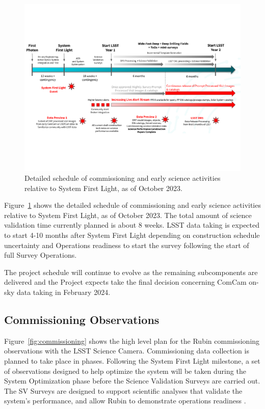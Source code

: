 \begin{figure}[htb]
\centering
\includegraphics[width=0.98\linewidth]{figures/rubinobs_on-sky_commissioning_and_early_science.pdf}
\caption{Detailed schedule of commissioning  and early science activities relative to System First Light, as of October 2023.}
\label{fig:commissioning-es-schedule}
\vspace{0.1cm}
\end{figure}

Figure~\ref{fig:commissioning-es-schedule} shows the detailed schedule of commissioning and early science activities relative to System First Light, as of October 2023.
The total amount of science validation time currently planned is about 8 weeks.  
LSST data taking is expected to start 4-10 months after System First Light depending on construction schedule uncertainty and Operations readiness to start the survey following the start of full Survey Operations.

The project schedule will continue to evolve as the remaining subcomponents are delivered and the Project expects take the final decision concerning ComCam on-sky data taking in February 2024.

\subsection{Commissioning Observations}
\label{ssec:commissioning-observations}

Figure~\ref{fig:commissioning} shows the high level plan for the Rubin commissioning observations with the LSST Science Camera.
Commissioning data collection is planned to take place in phases.
Following the System First Light milestone, a set of observations designed to help optimize the system will be taken during the System Optimization phase before the Science Validation Surveys are carried out. 
The SV Surveys are designed to support scientific analyses that validate the system's performance, and allow Rubin to demonstrate operations readiness .

